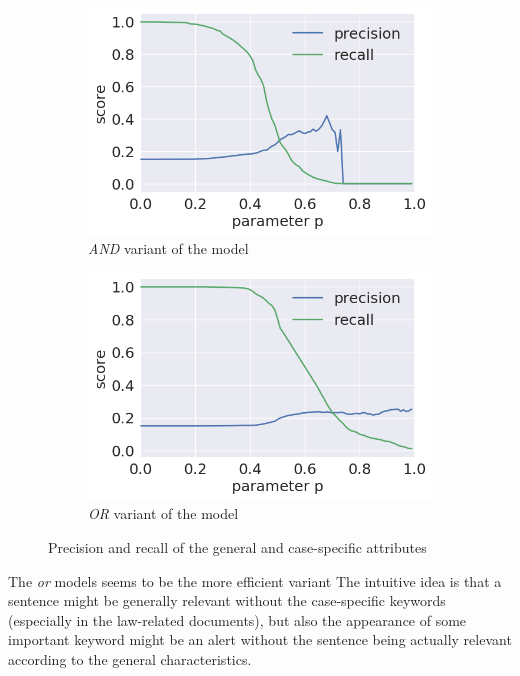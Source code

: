 \documentclass[
  digital, %
  notable,   %
  nolof,     %
  nolot,     %
  draft
]{fithesis3}
\begin{document}
\begin{figure}[h]
\begin{subfigure}{.5\textwidth}
  \centering
  \caption{\textit{AND} variant of the model}
  \label{fig:sent_andP}
  \includegraphics[width=\textwidth]{img/sent_andP}
\end{subfigure}%
\begin{subfigure}{.5\textwidth}
  \centering
  \caption{\textit{OR} variant of the model}
  \label{fig:sent_orP}
  \includegraphics[width=\textwidth]{img/sent_orP}
\end{subfigure}%
\caption{Precision and recall of the general and case-specific attributes}
\label{fig:sent_finalP}
\end{figure}

The \textit{or} models seems to be the more efficient variant
The intuitive idea is that a sentence might be generally relevant without the case-specific keywords (especially in the law-related documents), but also the appearance of some important keyword might be an alert without the sentence being actually relevant according to the general characteristics.
\end{document}
